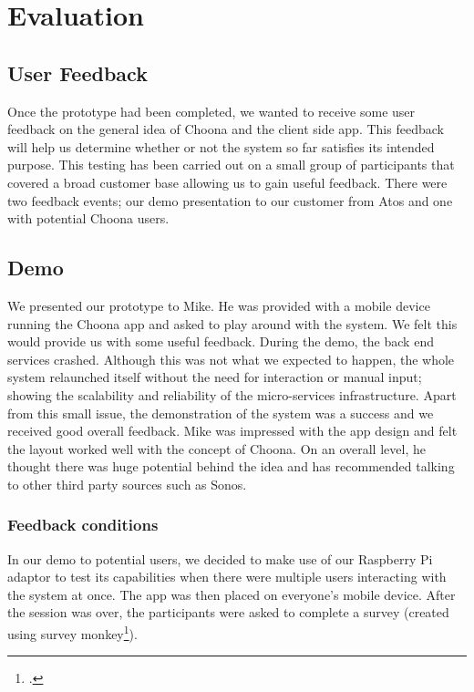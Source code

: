\section{Evaluation}

\subsection{User Feedback}
Once the prototype had been completed, we wanted to receive some user feedback on the general idea of Choona and the client side app. This feedback will help us determine whether or not the system so far satisfies its intended purpose. This testing has been carried out on a small group of participants that covered a broad customer base allowing us to gain useful feedback.  There were two feedback events; our demo presentation to our customer from Atos and one with potential Choona users.

\subsection{Demo}
We presented our prototype to Mike.  He was provided with a mobile device running the Choona app and asked to play around with the system.  We felt this would provide us with some useful feedback.  During the demo, the back end services crashed.  Although this was not what we expected to happen, the whole system relaunched itself without the need for interaction or manual input; showing the scalability and reliability of the micro-services infrastructure.  Apart from this small issue, the demonstration of the system was a success and we received good overall feedback.  Mike was impressed with the app design and felt the layout worked well with the concept of Choona.  On an overall level, he thought there was huge potential behind the idea and has recommended talking to other third party sources such as Sonos.

\subsubsection{Feedback conditions}
In our demo to potential users, we decided to make use of our Raspberry Pi adaptor to test its capabilities when there were multiple users interacting with the system at once. The app was then placed on everyone's mobile device. After the session was over, the participants were asked to complete a survey (created using survey monkey\footcite{survey}).

